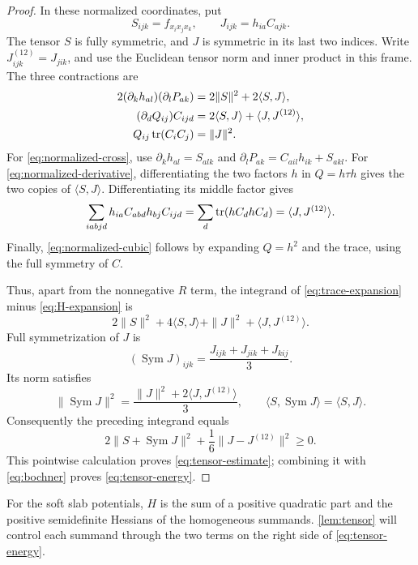 \begin{proof}
In these normalized coordinates, put
\[
 S_{ijk}=f_{x_ix_jx_k},\qquad J_{ijk}=h_{ia}C_{ajk}.
\]
The tensor $S$ is fully symmetric, and $J$ is symmetric in its last two indices.  Write $J^{(12)}_{ijk}=J_{jik}$, and use the Euclidean tensor norm and inner product in this frame. The three contractions are
\begin{align}
 2(\partial_kh_{al})(\partial_lP_{ak})
   &=2\|S\|^2+2\langle S,J\rangle,\label{eq:normalized-cross}\\
 (\partial_dQ_{ij})C_{ijd}
   &=2\langle S,J\rangle+\langle J,J^{(12)}\rangle,
       \label{eq:normalized-derivative}\\
 Q_{ij}\tr(C_iC_j)&=\|J\|^2.\label{eq:normalized-cubic}
\end{align}
For \eqref{eq:normalized-cross}, use $\partial_kh_{al}=S_{alk}$ and $\partial_lP_{ak}=C_{ail}h_{ik}+S_{akl}$. For \eqref{eq:normalized-derivative}, differentiating the two factors $h$ in $Q=h\tau h$ gives the two copies of $\langle S,J\rangle$. Differentiating its middle factor gives
\[
 \sum_{iabjd}h_{ia}C_{abd}h_{bj}C_{ijd}
 =\sum_d\tr(hC_dhC_d)
 =\langle J,J^{(12)}\rangle.
\]
Finally, \eqref{eq:normalized-cubic} follows by expanding $Q=h^2$ and the trace, using the full symmetry of $C$.

Thus, apart from the nonnegative $R$ term, the integrand of \eqref{eq:trace-expansion} minus \eqref{eq:H-expansion} is
\[
 2\|S\|^2+4\langle S,J\rangle
   +\|J\|^2+\langle J,J^{(12)}\rangle.
\]
Full symmetrization of $J$ is
\[
 (\operatorname{Sym}J)_{ijk}
 =\frac{J_{ijk}+J_{jik}+J_{kij}}3.
\]
Its norm satisfies
\[
 \|\operatorname{Sym}J\|^2
 =\frac{\|J\|^2+2\langle J,J^{(12)}\rangle}{3},
 \qquad
 \langle S,\operatorname{Sym}J\rangle=\langle S,J\rangle.
\]
Consequently the preceding integrand equals
\begin{equation}\label{eq:tensor-squares}
 2\|S+\operatorname{Sym}J\|^2
 +\frac16\|J-J^{(12)}\|^2\ge0.
\end{equation}
This pointwise calculation proves \eqref{eq:tensor-estimate}; combining it with \eqref{eq:bochner} proves \eqref{eq:tensor-energy}.
\end{proof}

For the soft slab potentials, $H$ is the sum of a positive quadratic part and the positive semidefinite Hessians of the homogeneous summands.  \cref{lem:tensor} will control each summand through the two terms on the right side of \eqref{eq:tensor-energy}.
